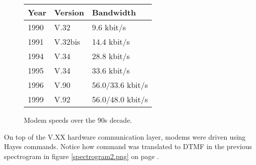  \begin{figure}[H]
\centering  
\begin{tabularx}{\textwidth}{ L{0.2} L{0.3} L{0.5}}
  \toprule
  \textbf{Year} & \textbf{Version} & \textbf{Bandwidth} \\
  \toprule 
   
    1990 & V.32 & 9.6 kbit/s \\
    1991 & V.32bis &  14.4 kbit/s \\
    1994 & V.34 & 28.8 kbit/s \\
    1995 & V.34 & 33.6 kbit/s \\
    1996 & V.90 & 56.0/33.6 kbit/s\\
    1999 & V.92 & 56.0/48.0 kbit/s\\
   
   \toprule
\end{tabularx}
\caption{Modem speeds over the 90s decade.}
\end{figure}



\par
On top of the V.XX hardware communication layer, modems were driven using Hayes commands. Notice how command  was translated to DTMF in the previous spectrogram in figure \ref{spectrogram2.png} on page \pageref{spectrogram2.png}.\\

